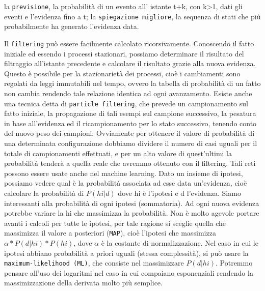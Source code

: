 		la \texttt{previsione}, la probabilità di un evento all' istante t+k, con k>1, dati gli eventi e l'evidenza fino a t;
		la \texttt{spiegazione migliore}, la sequenza di stati che più probabilmente ha generato l'evidenza data.
		\par 
		Il \texttt{filtering} può essere facilmente calcolato ricorsivamente. Conoscendo il fatto iniziale ed essendo i processi stazionari, possiamo determinare il risultato del filtraggio all'istante precedente e calcolare il risultato grazie alla nuova evidenza.
		Questo è possibile per la stazionarietà dei processi, cioè i cambiamenti sono regolati da leggi immutabili nel tempo, ovvero la tabella di probabilità di un fatto non cambia rendendo tale relazione identica ad ogni avanzamento.
		Esiste anche una tecnica detta di \texttt{particle filtering}, che prevede un campionamento sul fatto iniziale, la propagazione di tali esempi sul campione successivo, la pesatura in base all'evidenza ed il ricampionamento per lo stato successivo, tenendo conto del nuovo peso dei campioni. Ovviamente per ottenere il valore di probabilità di una determinata configurazione dobbiamo dividere il numero di casi uguali per il totale di campionamenti effettuati, e per un alto valore di quest'ultimi la probabilità tenderà a quella reale che avremmo ottenuto con il filtering. Tali reti possono essere usate anche nel machine learning. Dato un insieme di ipotesi, possiamo vedere qual è la probabilità associata ad esse data un'evidenza, cioè calcolare la probabilità di $P(hi|d)$ dove hi è l'ipotesi e d l'evidenza. Siamo interessanti alla probabilità di ogni ipotesi (sommatoria). Ad ogni nuova evidenza potrebbe variare la hi che massimizza la probabilità. Non è molto agevole portare avanti i calcoli per tutte le ipotesi, per tale ragione si sceglie quella che massimizza il valore a posteriori (\texttt{MAP}), cioè l'ipotesi che massimizza $\alpha*P(d|hi)*P(hi)$, dove $\alpha$ è la costante di normalizzazione. Nel caso in cui le ipotesi abbiano probabilità a priori uguali (stessa complessità), si può usare la \texttt{maximum-likelihood (ML)}, che consiste nel massimizzare $P(d|hi)$.
		Potremmo pensare all'uso dei logaritmi nel caso in cui compaiano esponenziali rendendo la massimizzazione della derivata molto più semplice.
		
